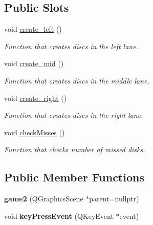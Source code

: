 \subsection*{Public Slots}
\begin{DoxyCompactItemize}
\item 
void \hyperlink{classgame2_a420782b0d5c32bf9960600a13a30c1f2}{create\+\_\+left} ()
\begin{DoxyCompactList}\small\item\em Function that creates discs in the left lane. \end{DoxyCompactList}\item 
void \hyperlink{classgame2_a6e5964212932ec9d08d5df31a93b3010}{create\+\_\+mid} ()
\begin{DoxyCompactList}\small\item\em Function that creates discs in the middle lane. \end{DoxyCompactList}\item 
void \hyperlink{classgame2_a1a554d82d02057789cfdfc8381bf5b4c}{create\+\_\+right} ()
\begin{DoxyCompactList}\small\item\em Function that creates discs in the right lane. \end{DoxyCompactList}\item 
void \hyperlink{classgame2_a8d1b4b72e005fb59df223b5df7757d43}{check\+Misses} ()
\begin{DoxyCompactList}\small\item\em Function that checks number of missed disks. \end{DoxyCompactList}\end{DoxyCompactItemize}
\subsection*{Public Member Functions}
\begin{DoxyCompactItemize}
\item 
\mbox{\label{classgame2_a6ffa0bd5a0bc924421686b3a6951bdd4}} 
{\bfseries game2} (Q\+Graphics\+Scene $\ast$parent=nullptr)
\item 
\mbox{\label{classgame2_a8c9e777d1909be0a2d5d9e7f96d65cf1}} 
void {\bfseries key\+Press\+Event} (Q\+Key\+Event $\ast$event)
\end{DoxyCompactItemize}
